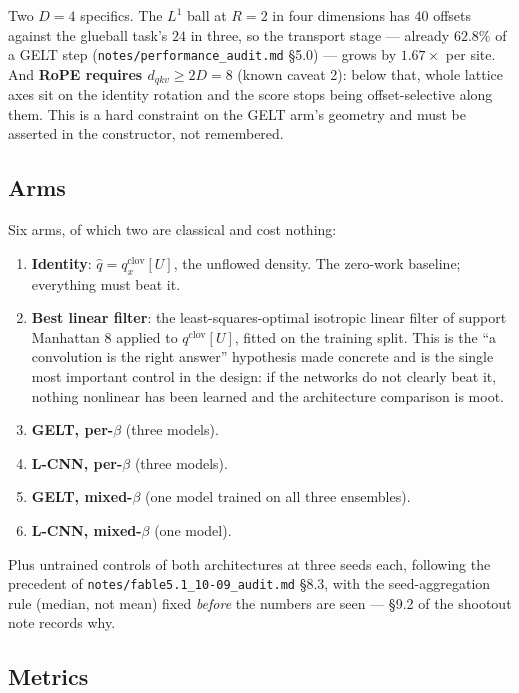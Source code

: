 \documentclass[11pt,a4paper]{article}
\newcommand{\qhat}{\hat{q}}
\begin{document}
Two $D = 4$ specifics. The $L^1$ ball at $R = 2$ in four dimensions has
$40$ offsets against the glueball task's $24$ in three, so the transport stage ---
already $62.8\%$ of a GELT step
(\texttt{notes/performance\_audit.md} \S5.0) --- grows by $1.67\times$ per site.
And \textbf{RoPE requires $d_{qkv} \ge 2D = 8$} (known caveat 2): below that,
whole lattice axes sit on the identity rotation and the score stops being
offset-selective along them. This is a hard constraint on the GELT arm's
geometry and must be asserted in the constructor, not remembered.

\subsection{Arms}

Six arms, of which two are classical and cost nothing:

\begin{enumerate}
\item \textbf{Identity}: $\qhat = q^{\mathrm{clov}}_x[U]$, the unflowed density.
      The zero-work baseline; everything must beat it.
\item \textbf{Best linear filter}: the least-squares-optimal isotropic linear
      filter of support Manhattan $8$ applied to $q^{\mathrm{clov}}[U]$, fitted on
      the training split. This is the ``a convolution is the right answer''
      hypothesis made concrete and is the single most important control in the
      design: if the networks do not clearly beat it, nothing nonlinear has been
      learned and the architecture comparison is moot.
\item \textbf{GELT, per-$\beta$} (three models).
\item \textbf{L-CNN, per-$\beta$} (three models).
\item \textbf{GELT, mixed-$\beta$} (one model trained on all three ensembles).
\item \textbf{L-CNN, mixed-$\beta$} (one model).
\end{enumerate}
Plus untrained controls of both architectures at three seeds each, following the
precedent of \texttt{notes/fable5.1\_10-09\_audit.md} \S8.3, with the
seed-aggregation rule (median, not mean) fixed \emph{before} the numbers are
seen --- \S9.2 of the shootout note records why.

\subsection{Metrics}
\end{document}
